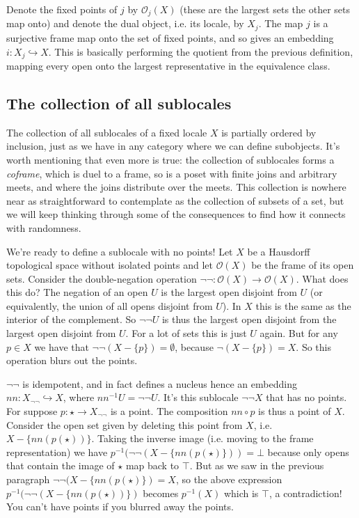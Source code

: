 \documentclass[12pt]{extarticle}
\renewcommand{\o}{\ensuremath{\mathcal{O}}}
\begin{document}
Denote the fixed points of $j$ by $\o_j(X)$ (these are the largest sets the other sets map onto) and denote the dual object, i.e. its locale, by $X_j$. The map $j$ is a surjective frame map onto the set of fixed points, and so gives an embedding $i:X_j\hookrightarrow X$. This is basically performing the quotient from the previous definition, mapping every open onto the largest representative in the equivalence class.

\subsection{The collection of all sublocales}
The collection of all sublocales of a fixed locale $X$ is partially ordered by inclusion, just as we have in any category where we can define subobjects. It's worth mentioning that even more is true: the collection of sublocales forms a \emph{coframe}, which is duel to a frame, so is a poset with finite joins and arbitrary meets, and where the joins distribute over the meets. This collection is nowhere near as straightforward to contemplate as the collection of subsets of a set, but we will keep thinking through some of the consequences to find how it connects with randomness.

We're ready to define a sublocale with no points! Let $X$ be a Hausdorff topological space without isolated points and let $\o(X)$ be the frame of its open sets. Consider the double-negation operation $\neg\neg:\o(X)\to\o(X)$. What does this do? The negation of an open $U$ is the largest open disjoint from $U$ (or equivalently, the union of all opens disjoint from $U$). In $X$ this is the same as the interior of the complement. So $\neg\neg U$ is thus the largest open disjoint from the largest open disjoint from $U$. For a lot of sets this is just $U$ again. But for any $p\in X$ we have that $\neg\neg(X-\{p\}) = \emptyset$, because $\neg (X-\{p\})=X$. So this operation blurs out the points.

$\neg\neg$ is idempotent, and in fact defines a nucleus hence an embedding $nn:X_{\neg\neg}\hookrightarrow X$, where $nn^{-1}U=\neg\neg U$. It's this sublocale $\neg\neg X$ that has no points. For suppose $p:\star\to X_{\neg\neg}$ is a point. The composition $nn\circ p$ is thus a point of $X$. Consider the open set given by deleting this point from $X$, i.e. $X-\{nn(p(\star))\}$. Taking the inverse image (i.e. moving to the frame representation) we have $p^{-1}(\neg\neg(X-\{nn(p(\star)\})) = \bot$ because only opens that contain the image of $\star$ map back to $\top$. But as we saw in the previous paragraph $\neg\neg(X-\{nn(p(\star)\}) = X$, so the above expression $p^{-1}(\neg\neg(X-\{nn(p(\star))\})$ becomes $p^{-1}(X)$ which is $\top$, a contradiction! You can't have points if you blurred away the points.
\end{document}
